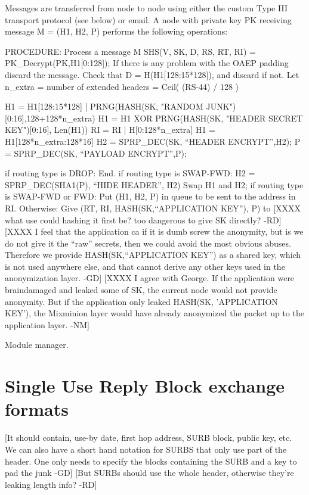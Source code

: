 Messages are transferred from node to node using either the custom Type
III transport protocol (see below) or email.  A node with private key
PK receiving message M = (H1, H2, P) performs the following operations:

PROCEDURE: Process a message M
	SHS(V, SK, D, RS, RT, RI) = PK_Decrypt(PK,H1[0:128]);
        If there is any problem with the OAEP padding discard the message.
        Check that D = H(H1[128:15*128]), and discard if not.
        Let n_extra = number of extended headers = Ceil( (RS-44) / 128 )
                  
        H1 = H1[128:15*128] | PRNG(HASH(SK, "RANDOM 
                                               JUNK")[0:16],128+128*n_extra)
	H1 = H1 XOR PRNG(HASH(SK, "HEADER SECRET KEY")[0:16], Len(H1))
        RI = RI | H[0:128*n_extra]
        H1 = H1[128*n_extra:128*16]
	H2 = SPRP_DEC(SK, ``HEADER ENCRYPT'',H2);
	P = SPRP_DEC(SK, ``PAYLOAD ENCRYPT'',P);

	if routing type is DROP:
                End.
	if routing type is SWAP-FWD:
		H2 = SPRP_DEC(SHA1(P), ``HIDE HEADER'', H2)
		Swap H1 and H2;
        if routing type is SWAP-FWD or FWD:
	   	Put (H1, H2, P) in queue to be sent to the address in RI.
        Otherwise:
		Give (RT, RI, HASH(SK,``APPLICATION KEY''), P) to
[XXXX what use could hashing it first be? too dangerous to give SK
  directly? -RD]
[XXXX I feel that the application ca if it is dumb screw the
                anonymity, but is we do not give it the ``raw''
                secrets, then we could avoid the most obvious
                abuses. Therefore we provide HASH(SK,``APPLICATION
                KEY'') as a shared key, which is not used anywhere
                else, and that cannot derive any other keys used in
                the anonymization layer. -GD] 
[XXXX I agree with George.  If the application were braindamaged and
      leaked some of SK, the current node would not provide
      anonymity.  But if the application only leaked HASH(SK,
      'APPLICATION KEY'), the Mixminion layer would have already
      anonymized the packet up to the application layer. -NM]
		
Module manager. 

\section{Single Use Reply Block exchange formats}

[It should contain, use-by date, first hop address, 
 SURB block, public key, etc.
 We can also have a short hand notation for SURBS that only
 use part of the header. One only needs to specify the 
 blocks containing the SURB and a key to pad the junk -GD]
 [But SURBs should use the whole header, otherwise they're
  leaking length info? -RD]


